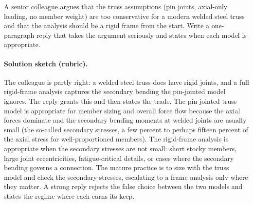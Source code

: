 \begin{exercise}
A senior colleague argues that the truss assumptions (pin joints,
axial-only loading, no member weight) are too conservative for a
modern welded steel truss and that the analysis should be a rigid
frame from the start. Write a one-paragraph reply that takes the
argument seriously and states when each model is appropriate.

\paragraph{Solution sketch (rubric).} The colleague is partly right: a
welded steel truss does have rigid joints, and a full rigid-frame
analysis captures the secondary bending the pin-jointed model ignores.
The reply grants this and then states the trade. The pin-jointed truss
model is appropriate for member sizing and overall force flow because the
axial forces dominate and the secondary bending moments at welded joints
are usually small (the so-called secondary stresses, a few percent to
perhaps fifteen percent of the axial stress for well-proportioned
members). The rigid-frame analysis is appropriate when the secondary
stresses are not small: short stocky members, large joint eccentricities,
fatigue-critical details, or cases where the secondary bending governs a
connection. The mature practice is to size with the truss model and check
the secondary stresses, escalating to a frame analysis only where they
matter. A strong reply rejects the false choice between the two models
and states the regime where each earns its keep.
\end{exercise}

